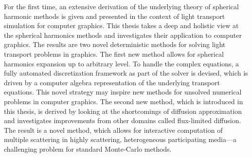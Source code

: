 For the first time, an extensive derivation of the underlying theory of spherical harmonic methods is given and presented in the context of light transport simulation for computer graphics. This thesis takes a deep and holistic view at the spherical harmonics methods and investigates their application to computer graphics. The results are two novel deterministic methods for solving light transport problems in graphics. The first new method allows for spherical harmonics expansion up to arbitrary level. To handle the complex equations, a fully automated discretization framework as part of the solver is devised, which is driven by a computer algebra representation of the underlying transport equations. This novel strategy may inspire new methods for unsolved numerical problems in computer graphics. The second new method, which is introduced in this thesis, is derived by looking at the shortcomings of diffusion approximation and investigates improvements from other domains called flux-limited diffusion. The result is a novel method, which allows for interactive computation of multiple scattering in highly scattering, heterogeneous participating media---a challenging problem for standard Monte-Carlo methods.